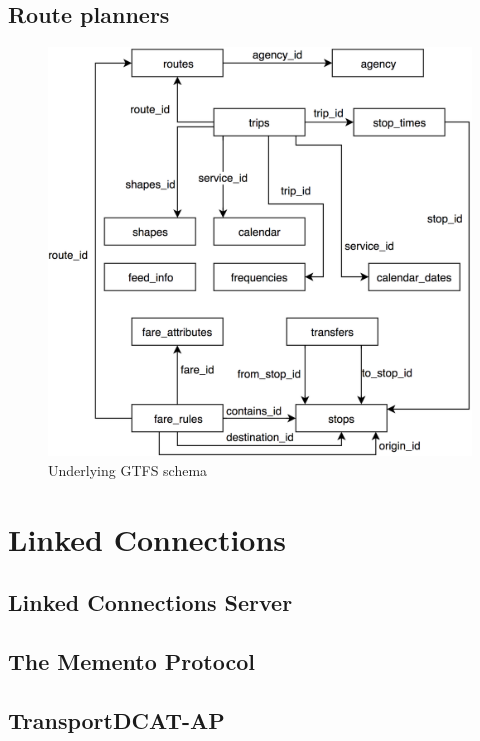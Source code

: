\subsection{Route planners}



\begin{figure}[h]
	\centering
	\includegraphics[width=1.0\linewidth]{images/gtfsmodel.png}
	\caption{Underlying GTFS schema}
	\label{fig:gtfs}
\end{figure}

\section{Linked Connections}

\subsection{Linked Connections Server}

\subsection{The Memento Protocol}

\subsection{TransportDCAT-AP}

